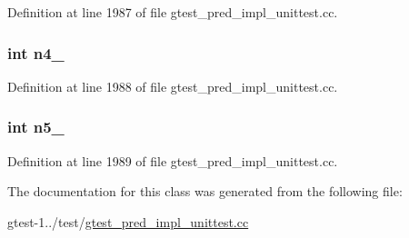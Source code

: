 \-Definition at line 1987 of file gtest\-\_\-pred\-\_\-impl\-\_\-unittest.\-cc.

\hypertarget{classPredicate5Test_aff849f20105b63bab116cb4e43ea8486}{
\subsubsection[{n4\-\_\-}]{\setlength{\rightskip}{0pt plus 5cm}int {\bf n4\-\_\-}}}\label{d3/d98/classPredicate5Test_aff849f20105b63bab116cb4e43ea8486}


\-Definition at line 1988 of file gtest\-\_\-pred\-\_\-impl\-\_\-unittest.\-cc.

\hypertarget{classPredicate5Test_a5030410dbfac5fb5bb099fad825fe7af}{
\subsubsection[{n5\-\_\-}]{\setlength{\rightskip}{0pt plus 5cm}int {\bf n5\-\_\-}}}\label{d3/d98/classPredicate5Test_a5030410dbfac5fb5bb099fad825fe7af}


\-Definition at line 1989 of file gtest\-\_\-pred\-\_\-impl\-\_\-unittest.\-cc.



\-The documentation for this class was generated from the following file\-:\begin{DoxyCompactItemize}
\item 
gtest-\/1../test/\hyperlink{gtest__pred__impl__unittest_8cc}{gtest\-\_\-pred\-\_\-impl\-\_\-unittest.\-cc}\end{DoxyCompactItemize}
